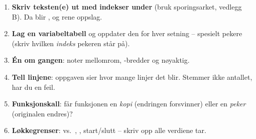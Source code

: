 

\begin{regel}
\begin{enumerate}
  \item \textbf{Skriv teksten(e) ut med indekser under} (bruk sporingsarket, vedlegg B). Da blir ,  og  rene oppslag.
  \item \textbf{Lag en variabeltabell} og oppdater den for hver setning -- spesielt pekere (skriv hvilken \emph{indeks} pekeren står på).
  \item \textbf{Én  om gangen}: noter mellomrom, -bredder og  nøyaktig.
  \item \textbf{Tell linjene}: oppgaven sier hvor mange linjer det blir. Stemmer ikke antallet, har du en feil.
  \item \textbf{Funksjonskall}: får funksjonen en \emph{kopi} (endringen forsvinner) eller en \emph{peker} (originalen endres)?
  \item \textbf{Løkkegrenser}: \cc{<} vs.\ \cc{<=}, , start/slutt -- skriv opp alle verdiene  tar.
\end{enumerate}
\end{regel}

